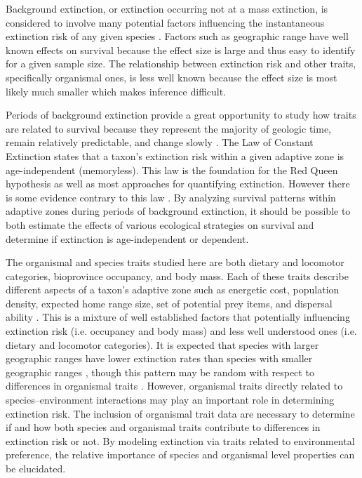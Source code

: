 \documentclass[12pt,letterpaper]{article}
\begin{document}
Background extinction, or extinction occurring not at a mass extinction, is considered to involve many potential factors influencing the instantaneous extinction risk of any given species \citep{Jablonski1986,Wang2003,Harnik2013,Kitchell1986,Nurnberg2013a,Payne2007}. Factors such as geographic range have well known effects on survival \citep{Payne2007,Jablonski1987} because the effect size is large and thus easy to identify for a given sample size. The relationship between extinction risk and other traits, specifically organismal ones, is less well known because the effect size is most likely much smaller which makes inference difficult.

Periods of background extinction provide a great opportunity to study how traits are related to survival because they represent the majority of geologic time, remain relatively predictable, and change slowly \citep{Jablonski1986,Raup1988}. The Law of Constant Extinction \citep{VanValen1973} states that a taxon's extinction risk within a given adaptive zone is age-independent (memoryless). This law is the foundation for the Red Queen hypothesis as well as most approaches for quantifying extinction. However there is some evidence contrary to this law \citep{Drake2014,Raup1975,Sepkoski1975,Finnegan2008}. By analyzing survival patterns within adaptive zones during periods of background extinction, it should be possible to both estimate the effects of various ecological strategies on survival and determine if extinction is age-independent or dependent. 

The organismal and species traits studied here are both dietary and locomotor categories, bioprovince occupancy, and body mass. Each of these traits describe different aspects of a taxon's adaptive zone such as energetic cost, population density, expected home range size, set of potential prey items, and dispersal ability \citep{Smith2004,Smith2008b,Damuth1981a,Damuth1979,Jernvall2004,Lyons2005,Lyons2010}. This is a mixture of well established factors that potentially influencing extinction risk (i.e. occupancy and body mass) and less well understood ones (i.e. dietary and locomotor categories). It is expected that species with larger geographic ranges have lower extinction rates than species with smaller geographic ranges \citep{Jablonski1986,Harnik2013,Nurnberg2013a,Jablonski2003,Roy2009c}, though this pattern may be random with respect to differences in organismal traits \citep{Raup1991b}. However, organismal traits directly related to species--environment interactions may play an important role in determining extinction risk.  The inclusion of organismal trait data are necessary to determine if and how both species and organismal traits contribute to differences in extinction risk or not. By modeling extinction via traits related to environmental preference, the relative importance of species and organismal level properties can be elucidated. 
\end{document}
